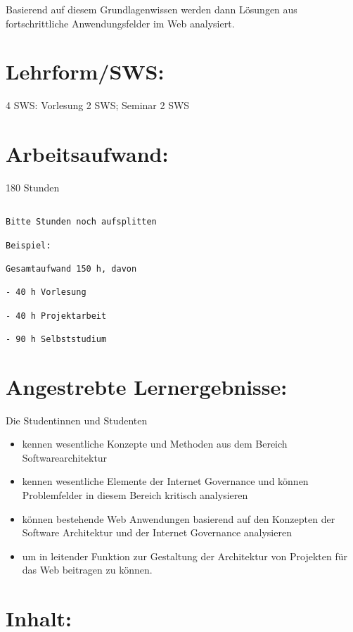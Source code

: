 Basierend auf diesem Grundlagenwissen werden dann Lösungen aus
fortschrittliche Anwendungsfelder im Web analysiert.

\section*{Lehrform/SWS:}\label{lehrformsws-28}

4 SWS: Vorlesung 2 SWS; Seminar 2 SWS

\section*{Arbeitsaufwand:}\label{arbeitsaufwand-28}

180 Stunden

\begin{verbatim}

Bitte Stunden noch aufsplitten

Beispiel:

Gesamtaufwand 150 h, davon 

- 40 h Vorlesung 

- 40 h Projektarbeit  

- 90 h Selbststudium 
\end{verbatim}

\section*{Angestrebte
Lernergebnisse:}\label{angestrebte-lernergebnisse-28}

Die Studentinnen und Studenten

\begin{itemize}
\item
  kennen wesentliche Konzepte und Methoden aus dem Bereich
  Softwarearchitektur
\item
  kennen wesentliche Elemente der Internet Governance und können
  Problemfelder in diesem Bereich kritisch analysieren
\item
  können bestehende Web Anwendungen basierend auf den Konzepten der
  Software Architektur und der Internet Governance analysieren
\item
  um in leitender Funktion zur Gestaltung der Architektur von Projekten
  für das Web beitragen zu können.
\end{itemize}

\section*{Inhalt:}\label{inhalt-28}

